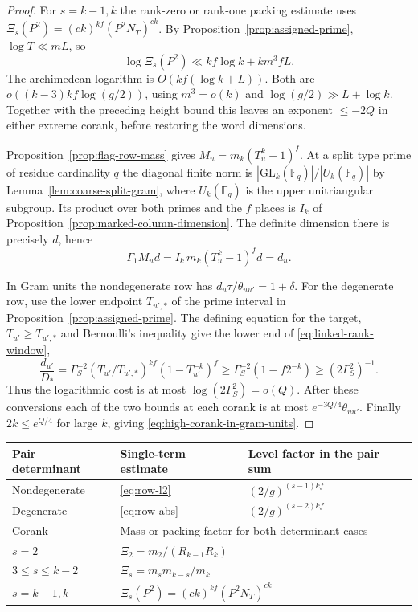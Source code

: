 \begin{proof}
For \(s=k-1,k\) the rank-zero or rank-one packing estimate uses
\(\Xi_s(P^2)=(ck)^{kf}(P^2 N_T)^{ck}\).
By Proposition~\ref{prop:assigned-prime}, \(\log T\ll mL\), so
\[
 \log\Xi_s(P^2)\ll kf\log k+k m^3 fL .
\]
The archimedean logarithm is \(O(kf(\log k+L))\).
Both are \(o((k-3)kf\log(g/2))\), using \(m^3=o(k)\) and
\(\log(g/2)\gg L+\log k\). Together with the preceding height bound
this leaves an exponent \(\le-2Q\) in either extreme corank,
before restoring the word dimensions.

Proposition~\ref{prop:flag-row-mass} gives \(M_u=m_k(T_u^k-1)^f\).
At a split type prime of residue cardinality \(q\) the diagonal
finite norm is \(|\mathrm{GL}_k(\mathbb F_q)|/|U_k(\mathbb F_q)|\)
by Lemma~\ref{lem:coarse-split-gram}, where \(U_k(\mathbb F_q)\)
is the upper unitriangular subgroup. Its product over both primes
and the \(f\) places is \(I_k\) of Proposition~\ref{prop:marked-column-dimension}.
The definite dimension there is precisely \(d\), hence
\[
 \Gamma_1 M_u d=I_k\,m_k(T_u^k-1)^f d=d_u .
\]

In Gram units the nondegenerate row has
\(d_u\tau/\theta_{uu'}=1+\delta\). For the degenerate row, use
the lower endpoint \(T_{u',*}\) of the prime interval in Proposition~\ref{prop:assigned-prime}.
The defining equation for the target, \(T_{u'}\ge T_{u',*}\)
and Bernoulli's inequality give the lower end of \eqref{eq:linked-rank-window},
\[
 \frac{d_{u'}}{D_*}
 =\Gamma_S^{-2}(T_{u'}/T_{u',*})^{kf}(1-T_{u'}^{-k})^f
 \ge \Gamma_S^{-2}(1-f2^{-k})\ge(2\Gamma_S^2)^{-1}.
\]
Thus the logarithmic cost is at most \(\log(2\Gamma_S^2)=o(Q)\).
After these conversions each of the two bounds at each corank
is at most \(e^{-3Q/4}\theta_{uu'}\). Finally \(2k\le e^{Q/4}\)
for large \(k\), giving \eqref{eq:high-corank-in-gram-units}.
\end{proof}

\begin{construction}
\begin{tabular}{@{}lll@{}}\toprule
Pair determinant & Single-term estimate & Level factor in the pair sum\\\midrule
Nondegenerate & \eqref{eq:row-l2} & \((2/g)^{(s-1)kf}\)\\
Degenerate & \eqref{eq:row-abs} & \((2/g)^{(s-2)kf}\)\\\midrule
Corank & \multicolumn{2}{l}{Mass or packing factor for both determinant cases}\\\midrule
\(s=2\) & \multicolumn{2}{l}{\(\Xi_2=m_2/(R_{k-1}R_k)\)}\\
\(3\le s\le k-2\) & \multicolumn{2}{l}{\(\Xi_s=m_s m_{k-s}/m_k\)}\\
\(s=k-1,k\) & \multicolumn{2}{l}{\(\Xi_s(P^2)=(ck)^{kf}(P^2N_T)^{ck}\)}\\\bottomrule
\end{tabular}
\caption{Factors in the high-corank counts. For a degenerate pair at \(s=2\) the level factor equals one. The amplitude gain \((C_a/k)^{kf}\) leaves \((C_a\upsilon/(e\pi))^{kf}\) after normalization. The two adjacent-rank mass denominators supply the factorial decay in \eqref{eq:middle-corank-factorial}.}\label{fig:high-corank-amplitude-choice}
\end{construction}

